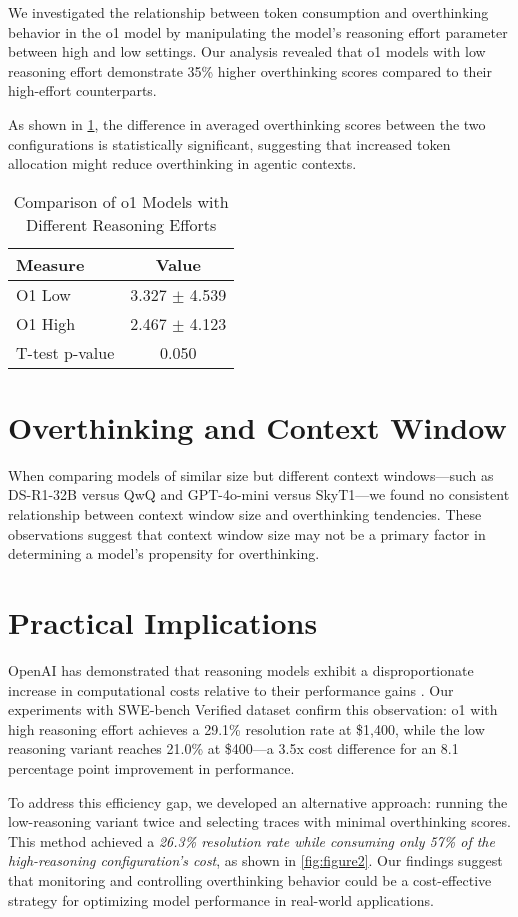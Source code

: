 We investigated the relationship between token consumption and overthinking behavior in the o1 model by manipulating the model's reasoning effort parameter between high and low settings. Our analysis revealed that o1 models with low reasoning effort demonstrate 35\% higher overthinking scores compared to their high-effort counterparts.

As shown in \cref{tab:o1_model_comparison}, the difference in averaged overthinking scores between the two configurations is statistically significant, suggesting that increased token allocation might reduce overthinking in agentic contexts.

\begin{table}[ht]
\centering
\begin{tabular}{lc}
\toprule
\textbf{Measure} & \textbf{Value} \\
\midrule
O1 Low        & 3.327 $\pm$ 4.539 \\
O1 High       & 2.467 $\pm$ 4.123 \\
\midrule
T-test p-value & 0.050 \\
\bottomrule
\end{tabular}
\caption{Comparison of o1 Models with Different Reasoning Efforts}
\label{tab:o1_model_comparison}
\end{table}

\section{Overthinking and Context Window}
\label{sec:context_window}

When comparing models of similar size but different context windows—such as DS-R1-32B versus QwQ and GPT-4o-mini versus SkyT1—we found no consistent relationship between context window size and overthinking tendencies. These observations suggest that context window size may not be a primary factor in determining a model's propensity for overthinking.

\section{Practical Implications}
\label{sec:implications}

OpenAI has demonstrated that reasoning models exhibit a disproportionate increase in computational costs relative to their performance gains \cite{arcprize2024oai}. Our experiments with SWE-bench Verified dataset confirm this observation: o1 with high reasoning effort achieves a 29.1\% resolution rate at \$1,400, while the low reasoning variant reaches 21.0\% at \$400—a 3.5x cost difference for an 8.1 percentage point improvement in performance.

To address this efficiency gap, we developed an alternative approach: running the low-reasoning variant twice and selecting traces with minimal overthinking scores. This method achieved a \textit{26.3\% resolution rate while consuming only 57\% of the high-reasoning configuration's cost}, as shown in \cref{fig:figure2}. Our findings suggest that monitoring and controlling overthinking behavior could be a cost-effective strategy for optimizing model performance in real-world applications.